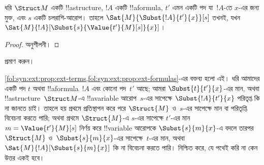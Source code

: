 \documentclass[../../../include/open-logic-section]{subfiles}
\begin{document}
\begin{prop} ধরি $\Struct M$ একটি
!!a{structure}, $!A$ একটি !!a{formula}, $t'$ এমন একটি পদ যা~$!A$-তে
$x$-এর জন্য মুক্ত, এবং $s$ একটি চলরাশি-আরোপ। তাহলে
$\Sat{M}{\Subst{!A}{t'}{x}}[s]$ তখনই, যখন
$\Sat{M}{!A}[\Subst{s}{\Value{t'}{M}[s]}{x}]$।
\end{prop}


\begin{proof}
অনুশীলনী।
\end{proof}

\begin{prob}
 প্রমাণ করুন।
\end{prob}

\begin{explain}
  \cref{fol:syn:ext:prop:ext-terms,fol:syn:ext:prop:ext-formulas}-এর
  বক্তব্য হলো এই। ধরি আমাদের একটি পদ $t$ অথবা !!a{formula}~$!A$ এবং
  কোনো পদ~$t'$ আছে; আমরা $\Subst{t}{t'}{x}$-এর মান, অথবা
  !!a{structure}~$\Struct M$-এ !!a{variable} আরোপ~$s$-এর সাপেক্ষে
  $\Subst{!A}{t'}{x}$ পরিতৃপ্ত কি না জানতে চাই। তাহলে হয় প্রথমে
  প্রতিস্থাপন করে পরে $\Struct{M}$ ও~$s$-এর সাপেক্ষে মান বা পরিতৃপ্তি
  বিবেচনা করতে পারি; অথবা প্রথমে $\Struct{M}$-এ $s$-এর সাপেক্ষে
  $t'$-এর মান~$m = \Value{t'}{M}[s]$ নির্ণয় করে !!{variable} আরোপকে
  $\Subst{s}{m}{x}$-এ বদলে তারপর $\Struct{M}$ ও~$\Subst{s}{m}{x}$-এর
  সাপেক্ষে~$t$-এর মান, অথবা $\Sat{M}{!A}[\Subst{s}{m}{x}]$ কি না
  বিবেচনা করতে পারি।
  নিশ্চিত করে, যে পথেই করি না কেন উত্তর একই হবে।
\end{explain}
\end{document}
